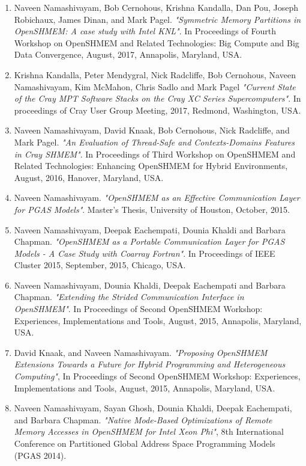 \begin{enumerate}
\setcounter{enumi}{0}
\item Naveen Namashivayam, Bob Cernohous, Krishna Kandalla, Dan Pou,
      Joseph Robichaux, James Dinan, and Mark Pagel.
      \textit{"Symmetric Memory Partitions in OpenSHMEM: A case study with
      Intel KNL"}. In Proceedings of Fourth Workshop on OpenSHMEM and
      Related Technologies: Big Compute and Big Data Convergence, August,
      2017, Annapolis, Maryland, USA.
\item Krishna Kandalla, Peter Mendygral, Nick Radcliffe, Bob Cernohous,
      Naveen Namashivayam, Kim McMahon, Chris Sadlo and Mark Pagel
      \textit{"Current State of the Cray MPT Software Stacks on the Cray XC
      Series Supercomputers"}. In proceedings of Cray User Group Meeting,
      2017, Redmond, Washington, USA.
\item Naveen Namashivayam, David Knaak, Bob Cernohous, Nick Radcliffe, and
      Mark Pagel.
      \textit{"An Evaluation of Thread-Safe and Contexts-Domains Features in
      Cray SHMEM"}. In Proceedings of Third Workshop on OpenSHMEM and Related
      Technologies: Enhancing OpenSHMEM for Hybrid Environments, August, 2016,
      Hanover, Maryland, USA.
\item Naveen Namashivayam.
      \textit{"OpenSHMEM as an Effective Communication Layer for PGAS Models"}.
      Master's Thesis, University of Houston, October, 2015.
\item Naveen Namashivayam, Deepak Eachempati, Dounia Khaldi and Barbara Chapman.
      \textit{"OpenSHMEM as a Portable Communication Layer for PGAS Models - A
      Case Study with Coarray Fortran"}. In Proceedings of IEEE Cluster 2015,
      September, 2015, Chicago, USA.
\item Naveen Namashivayam, Dounia Khaldi, Deepak Eachempati and Barbara Chapman.
      \textit{"Extending the Strided Communication Interface in OpenSHMEM"}. In
      Proceedings of Second OpenSHMEM Workshop: Experiences, Implementations and
      Tools, August, 2015, Annapolis, Maryland, USA.
\item David Knaak, and Naveen Namashivayam.
      \textit{"Proposing OpenSHMEM Extensions Towards a Future for Hybrid
      Programming and Heterogeneous Computing"}, In Proceedings of Second
      OpenSHMEM Workshop: Experiences, Implementations and Tools, August, 2015,
      Annapolis, Maryland, USA.
\item Naveen Namashivayam, Sayan Ghosh, Dounia Khaldi, Deepak Eachempati, and
      Barbara Chapman.
      \textit{"Native Mode-Based Optimizations of Remote Memory Accesses in
      OpenSHMEM for Intel Xeon Phi"}, 8th International Conference on Partitioned
      Global Address Space Programming Models (PGAS 2014).
\end{enumerate}


